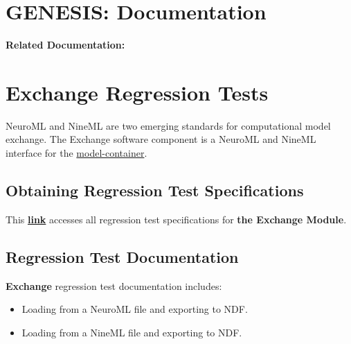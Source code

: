 \documentclass[12pt]{article}
\begin{document}
\section*{GENESIS: Documentation}

{\bf Related Documentation:}

\section*{Exchange Regression Tests}

NeuroML and NineML are two emerging standards for computational model
exchange.  The Exchange software component is a NeuroML and NineML
interface for the
\href{../model-container/model-container.tex}{model-container}.

\subsection*{Obtaining Regression Test Specifications}

This
\href{http://www.neurospaces.org/neurospaces_project/exchange/tests/html/index.html}{\bf
  link} accesses all regression test specifications for {\bf the
  Exchange Module}.

\subsection*{Regression Test Documentation}

{\bf Exchange} regression test documentation includes:
\begin{itemize}
\item Loading from a NeuroML file and exporting to NDF.
\item Loading from a NineML file and exporting to NDF.
\end{itemize}
\end{document}
